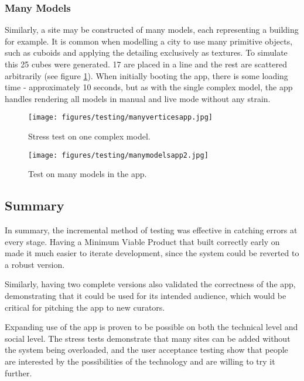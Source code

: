 \documentclass[12pt, a4paper]{article}
\begin{document}
\subsubsection{Many Models}
Similarly, a site may be constructed of many models, each representing a building for example. It is common when modelling a city to use many primitive objects, such as cuboids and applying the detailing exclusively as textures. To simulate this 25 cubes were generated. 17 are placed in a line and the rest are scattered arbitrarily (see figure \ref{fig:manymodelsapp}). When initially booting the app, there is some loading time - approximately 10 seconds, but as with the single complex model, the app handles rendering all models in manual and live mode without any strain. 

\begin{figure}[H]
\centering
\begin{minipage}{.5\textwidth}
  \centering
  \texttt{[image: figures/testing/manyverticesapp.jpg]}
    \caption{Stress test on one complex model.}
  \label{fig:manyverticesapp}
\end{minipage}%
\begin{minipage}{.5\textwidth}
  \centering
  \texttt{[image: figures/testing/manymodelsapp2.jpg]}
  \caption{Test on many models in the app.}
    \label{fig:manymodelsapp}
\end{minipage}
\end{figure}

\subsection{Summary}
In summary, the incremental method of testing was effective in catching errors at every stage. Having a Minimum Viable Product that built correctly early on made it much easier to iterate development, since the system could be reverted to a robust version. 

Similarly, having two complete versions also validated the correctness of the app, demonstrating that it could be used for its intended audience, which would be critical for pitching the app to  new curators.

Expanding use of the app is proven to be possible on both the technical level and social level. The stress tests demonstrate that many sites can be added without the system being overloaded, and the user acceptance testing show that people are interested by the possibilities of the technology and are willing to try it further.
\end{document}
